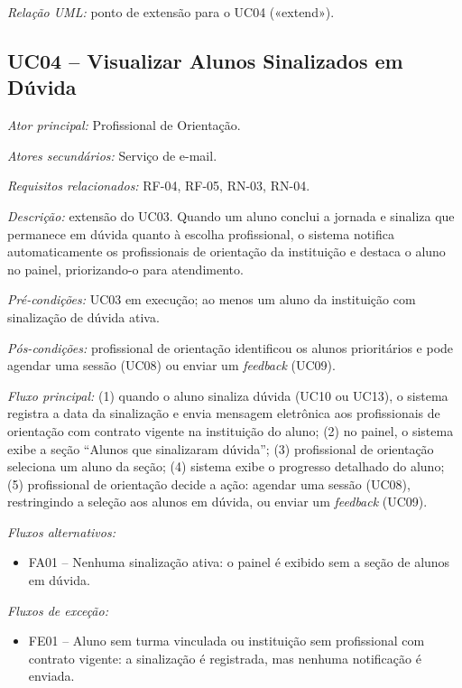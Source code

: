 \textit{Relação UML:} ponto de extensão para o UC04 («extend»).

\subsection*{UC04 -- Visualizar Alunos Sinalizados em Dúvida}\label{uc:uc04}

\textit{Ator principal:} Profissional de Orientação.

\textit{Atores secundários:} Serviço de e-mail.

\textit{Requisitos relacionados:} RF-04, RF-05, RN-03, RN-04.

\textit{Descrição:} extensão do UC03. Quando um aluno conclui a jornada e sinaliza que permanece em dúvida quanto à escolha profissional, o sistema notifica automaticamente os profissionais de orientação da instituição e destaca o aluno no painel, priorizando-o para atendimento.

\textit{Pré-condições:} UC03 em execução; ao menos um aluno da instituição com sinalização de dúvida ativa.

\textit{Pós-condições:} profissional de orientação identificou os alunos prioritários e pode agendar uma sessão (UC08) ou enviar um \textit{feedback} (UC09).

\textit{Fluxo principal:} (1) quando o aluno sinaliza dúvida (UC10 ou UC13), o sistema registra a data da sinalização e envia mensagem eletrônica aos profissionais de orientação com contrato vigente na instituição do aluno; (2) no painel, o sistema exibe a seção ``Alunos que sinalizaram dúvida''; (3) profissional de orientação seleciona um aluno da seção; (4) sistema exibe o progresso detalhado do aluno; (5) profissional de orientação decide a ação: agendar uma sessão (UC08), restringindo a seleção aos alunos em dúvida, ou enviar um \textit{feedback} (UC09).

\textit{Fluxos alternativos:}

\begin{itemize}[label={},leftmargin=\parindent,itemsep=0pt,topsep=0pt]
  \item FA01 – Nenhuma sinalização ativa: o painel é exibido sem a seção de alunos em dúvida.
\end{itemize}

\textit{Fluxos de exceção:}

\begin{itemize}[label={},leftmargin=\parindent,itemsep=0pt,topsep=0pt]
  \item FE01 – Aluno sem turma vinculada ou instituição sem profissional com contrato vigente: a sinalização é registrada, mas nenhuma notificação é enviada.
\end{itemize}

